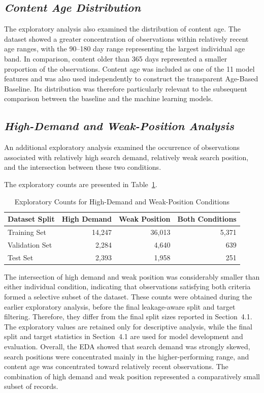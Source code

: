 \documentclass[12pt,a4paper]{report}
\begin{document}
\subsection{\textit{Content Age Distribution}}

The exploratory analysis also examined the distribution of content age. The dataset showed a greater concentration of observations within relatively recent age ranges, with the 90--180 day range representing the largest individual age band. In comparison, content older than 365 days represented a smaller proportion of the observations. Content age was included as one of the 11 model features and was also used independently to construct the transparent Age-Based Baseline. Its distribution was therefore particularly relevant to the subsequent comparison between the baseline and the machine learning models.

\subsection{\textit{High-Demand and Weak-Position Analysis}}

An additional exploratory analysis examined the occurrence of observations associated with relatively high search demand, relatively weak search position, and the intersection between these two conditions.

The exploratory counts are presented in Table~\ref{tab:high_demand_weak_position}.

\begin{table}[htbp]
\centering
\caption{Exploratory Counts for High-Demand and Weak-Position Conditions}
\label{tab:high_demand_weak_position}
\begin{tabular}{|l|r|r|r|}
\hline
\textbf{Dataset Split} & \textbf{High Demand} & \textbf{Weak Position} & \textbf{Both Conditions} \\
\hline
Training Set & 14,247 & 36,013 & 5,371 \\
\hline
Validation Set & 2,284 & 4,640 & 639 \\
\hline
Test Set & 2,393 & 1,958 & 251 \\
\hline
\end{tabular}
\end{table}
The intersection of high demand and weak position was considerably smaller than either individual condition, indicating that observations satisfying both criteria formed a selective subset of the dataset. These counts were obtained during the earlier exploratory analysis, before the final leakage-aware split and target filtering. Therefore, they differ from the final split sizes reported in Section~4.1. The exploratory values are retained only for descriptive analysis, while the final split and target statistics in Section~4.1 are used for model development and evaluation. Overall, the EDA showed that search demand was strongly skewed, search positions were concentrated mainly in the higher-performing range, and content age was concentrated toward relatively recent observations. The combination of high demand and weak position represented a comparatively small subset of records.
\end{document}
